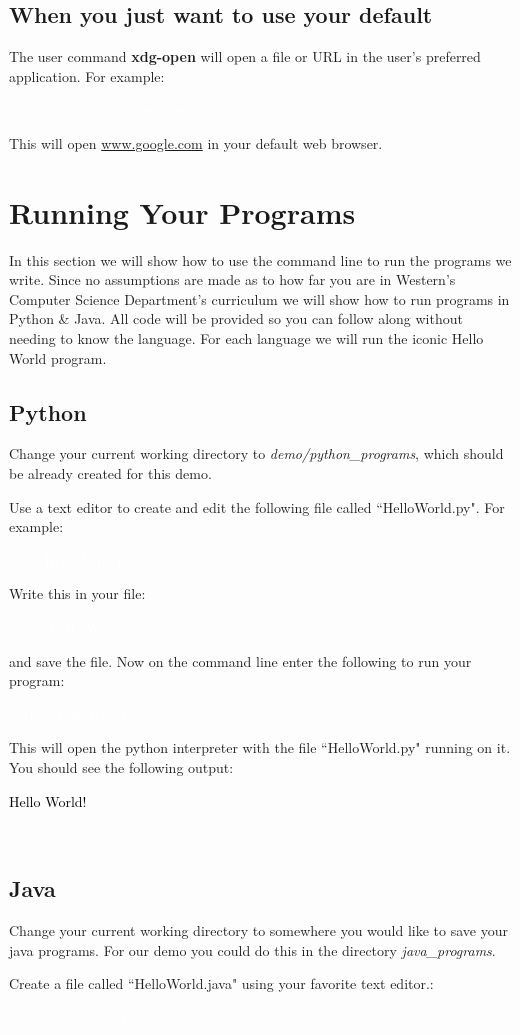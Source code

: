 \documentclass[oneside]{book}
\newcommand{\commandline}[1]{\begin{center} \colorbox{Dark}{\textcolor{white}{#1}} \end{center}}
\newcommand{\exampleout}[1]{\begin{center} \colorbox{Light}{\textcolor{black}{#1}} \end{center}}
\begin{document}
\subsection{When you just want to use your default}
The user command \textbf{xdg-open} will open a file or URL in the user's preferred application. For example:
\commandline{xdg-open `https://www.google.com'}

This will open \url{www.google.com} in your default web browser.

\section{Running Your Programs}
In this section we will show how to use the command line to run the programs we write. Since no assumptions are made as to how far you are in Western's Computer Science Department's curriculum we will show how to run programs in Python \& Java. All code will be provided so you can follow along without needing to know the language. For each language we will run the iconic Hello World program.
\subsection{Python}
Change your current working directory to \textit{demo/python\_programs}, which should be already created for this demo.

Use a text editor to create and edit the following file called ``HelloWorld.py". For example:
\commandline{atom HelloWorld.py}

Write this in your file:

\commandline{print("Hello World!")}
 and save the file. Now on the command line enter the following to run your program:
\commandline{python HelloWorld.py}
This will open the python interpreter with the file ``HelloWorld.py" running on it. You should see the following output:
\exampleout{Hello World!}\\

\subsection{Java}
Change your current working directory to somewhere you would like to save your java programs. For our demo you could do this in the directory \textit{java\_programs}.

Create a file called ``HelloWorld.java" using your favorite text editor.:

\commandline{[some text editor] HelloWorld.java}
\end{document}
